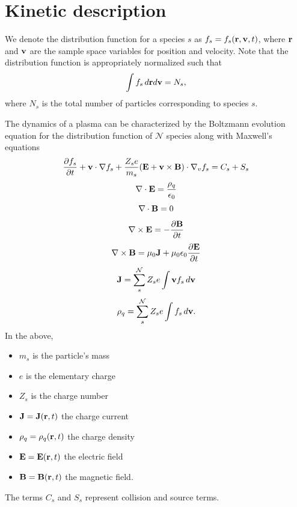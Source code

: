 \documentclass[a4paper,11pt]{report}
\begin{document}
\section{Kinetic description}
We denote the distribution function for a species $s$ as $f_s = f_s(\mathbf{r}, \mathbf{v}, t)$, where $\mathbf{r}$ and $\mathbf{v}$ are the sample space variables for position and velocity. Note that the distribution function is appropriately normalized such that
\begin{equation}
\int f_s \, d\mathbf{r} d\mathbf{v} = N_s,
\end{equation}
where $N_s$ is the total number of particles corresponding to species $s$. 

The dynamics of a plasma can be characterized by the Boltzmann evolution equation for the distribution function of $\mathcal{N}$ species along with Maxwell's equations
\begin{equation}
\label{eq:kinetic_equation}
\frac{\partial f_s}{\partial t} + \mathbf{v} \cdot \nabla f_s + \frac{Z_s e}{m_s} ( \mathbf{E} + \mathbf{v} \times \mathbf{B} ) \cdot \nabla_v f_s = C_s + S_s
\end{equation}
\begin{equation}
\label{eq:maxwell_3}
\nabla \cdot \mathbf{E} = \frac{\rho_q}{\epsilon_0} 
\end{equation}
\begin{equation}
\label{eq:maxwell_4}
\nabla \cdot \mathbf{B} = 0
\end{equation}
\begin{equation}
\label{eq:maxwell_1}
\nabla \times \mathbf{E} = -\frac{ \partial \mathbf{B}}{\partial t}
\end{equation}
\begin{equation}
\label{eq:maxwell_2}
\nabla \times \mathbf{B} = \mu_0 \mathbf{J} + \mu_0 \epsilon_0 \frac{\partial \mathbf{E}}{\partial t}
\end{equation}
\begin{equation}
\mathbf{J} = \sum_s^\mathcal{N} Z_s e \int \mathbf{v} f_s \, d\mathbf{v}
\end{equation}
\begin{equation}
\rho_q = \sum_s^\mathcal{N} Z_s e \int f_s \, d\mathbf{v}.
\end{equation}
In the above, 
\begin{itemize}
\item $m_s$ is the particle's mass
\item $e$ is the elementary charge
\item $Z_s$ is the charge number
\item $\mathbf{J} = \mathbf{J}(\mathbf{r},t)$ the charge current
\item $\rho_q = \rho_q(\mathbf{r},t)$ the charge density
\item $\mathbf{E} = \mathbf{E}(\mathbf{r},t)$ the electric field
\item $\mathbf{B} = \mathbf{B}(\mathbf{r},t)$ the magnetic field.
\end{itemize}
The terms $C_s$ and $S_s$ represent collision and source terms.
\end{document}

